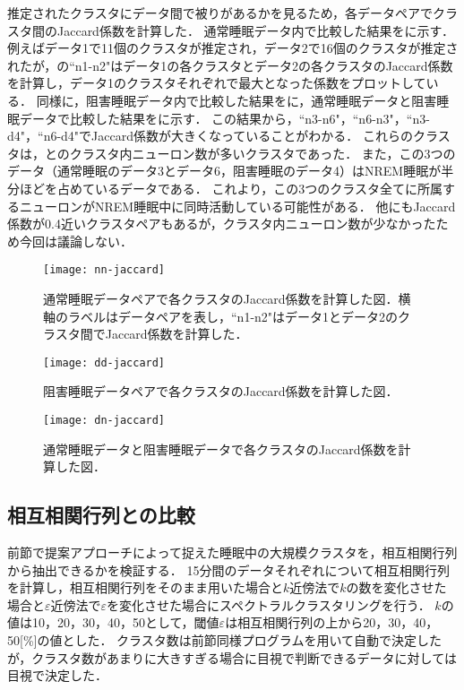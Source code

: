 推定されたクラスタにデータ間で被りがあるかを見るため，各データペアでクラスタ間のJaccard係数を計算した．
通常睡眠データ内で比較した結果をに示す．
例えばデータ1で11個のクラスタが推定され，データ2で16個のクラスタが推定されたが，の``n1-n2"はデータ1の各クラスタとデータ2の各クラスタのJaccard係数を計算し，データ1のクラスタそれぞれで最大となった係数をプロットしている．
同様に，阻害睡眠データ内で比較した結果をに，通常睡眠データと阻害睡眠データで比較した結果をに示す．
この結果から，``n3-n6"，``n6-n3"，``n3-d4"，``n6-d4"でJaccard係数が大きくなっていることがわかる．
これらのクラスタは，とのクラスタ内ニューロン数が多いクラスタであった．
また，この3つのデータ（通常睡眠のデータ3とデータ6，阻害睡眠のデータ4）はNREM睡眠が半分ほどを占めているデータである．
これより，この3つのクラスタ全てに所属するニューロンがNREM睡眠中に同時活動している可能性がある．
他にもJaccard係数が0.4近いクラスタペアもあるが，クラスタ内ニューロン数が少なかったため今回は議論しない．

\begin{figure}[htbp]
    \begin{center}
				\texttt{[image: nn-jaccard]}
				\caption{通常睡眠データペアで各クラスタのJaccard係数を計算した図．横軸のラベルはデータペアを表し，``n1-n2"はデータ1とデータ2のクラスタ間でJaccard係数を計算した．}
        \label{fig:nn-jaccard} \end{center}
\end{figure}
\begin{figure}[htbp]
    \begin{center}
				\texttt{[image: dd-jaccard]}
				\caption{阻害睡眠データペアで各クラスタのJaccard係数を計算した図．}
        \label{fig:dd-jaccard}
    \end{center}
\end{figure}
\begin{figure}[htbp]
    \begin{center}
				\texttt{[image: dn-jaccard]}
				\caption{通常睡眠データと阻害睡眠データで各クラスタのJaccard係数を計算した図．}
        \label{fig:dn-jaccard}
    \end{center}
\end{figure}

\subsection{相互相関行列との比較}
前節で提案アプローチによって捉えた睡眠中の大規模クラスタを，相互相関行列から抽出できるかを検証する．
15分間のデータそれぞれについて相互相関行列を計算し，相互相関行列をそのまま用いた場合と$k$近傍法で$k$の数を変化させた場合と$\varepsilon$近傍法で$\varepsilon$を変化させた場合にスペクトラルクラスタリングを行う．
$k$の値は10，20，30，40，50として，閾値$\varepsilon$は相互相関行列の上から20，30，40，50[\%]の値とした．
クラスタ数は前節同様プログラムを用いて自動で決定したが，クラスタ数があまりに大きすぎる場合に目視で判断できるデータに対しては目視で決定した．

